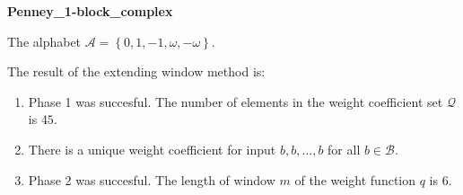 \begin{exmp}
\textbf{ Penney\_1-block\_complex }

\label{ex:Penney1-blockcomplex}

The alphabet $\mathcal{A} =\left\{0, 1, -1, \omega, -\omega\right\}$.

The result of the extending window method is:
\begin{enumerate}
    \item Phase 1 was succesful.
The number of elements in the weight coefficient set $\mathcal{Q}$ is $45$.

    \item There is a unique weight coefficient for input $b,b,\dots,b$ for all $b\in\mathcal{B}$.

    \item Phase 2 was succesful.
The length of window $m$ of the weight function $q$ is 6.
\end{enumerate}
\end{exmp}
